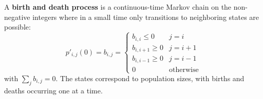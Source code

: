 A \textbf{birth and death process} is a continuous-time Markov chain on the non-negative integers where in a small time only transitions to neighboring states are possible:
$$p'_{i,j}(0) = b_{i,j} = \begin{cases}
b_{i,i} \leq 0 & j = i \\
b_{i,i+1} \geq 0 & j = i+1 \\
b_{i,i-1} \geq 0 & j = i-1 \\
0 & \text{otherwise}
\end{cases}$$
with $\sum_j b_{i,j} = 0$. The states correspond to population sizes, with births and deaths occurring one at a time.
